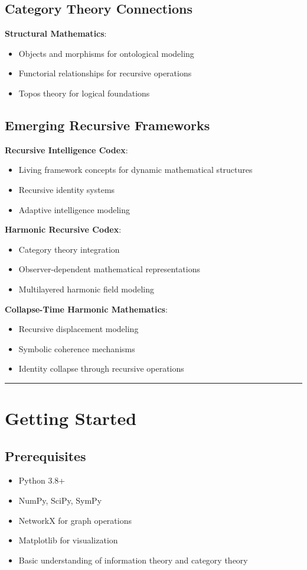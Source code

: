\subsection{Category Theory Connections}
\textbf{Structural Mathematics}:
\begin{itemize}
\item Objects and morphisms for ontological modeling
\item Functorial relationships for recursive operations
\item Topos theory for logical foundations
\end{itemize}

\subsection{Emerging Recursive Frameworks}
\textbf{Recursive Intelligence Codex}:
\begin{itemize}
\item Living framework concepts for dynamic mathematical structures
\item Recursive identity systems
\item Adaptive intelligence modeling
\end{itemize}

\textbf{Harmonic Recursive Codex}:
\begin{itemize}
\item Category theory integration
\item Observer-dependent mathematical representations
\item Multilayered harmonic field modeling
\end{itemize}

\textbf{Collapse-Time Harmonic Mathematics}:
\begin{itemize}
\item Recursive displacement modeling
\item Symbolic coherence mechanisms
\item Identity collapse through recursive operations
\end{itemize}

\hrule

\section{Getting Started}

\subsection{Prerequisites}
\begin{itemize}
\item Python 3.8+
\item NumPy, SciPy, SymPy
\item NetworkX for graph operations
\item Matplotlib for visualization
\item Basic understanding of information theory and category theory
\end{itemize}

